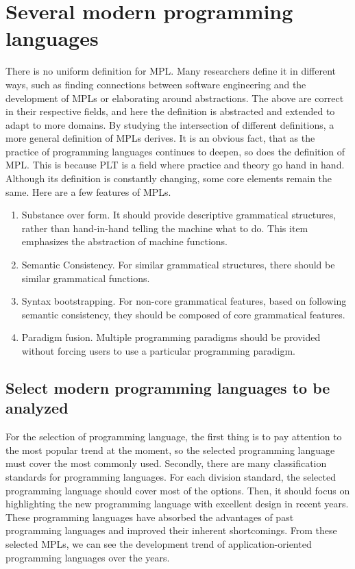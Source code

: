 \section{Several modern programming languages}

There is no uniform definition for MPL. Many researchers define it in different ways, such as finding connections between software engineering and the development of MPLs or elaborating around abstractions. The above are correct in their respective fields, and here the definition is abstracted and extended to adapt to more domains. By studying the intersection of different definitions, a more general definition of MPLs derives. It is an obvious fact, that as the practice of programming languages continues to deepen, so does the definition of MPL. This is because PLT is a field where practice and theory go hand in hand. Although its definition is constantly changing, some core elements remain the same. Here are a few features of MPLs.

\begin{enumerate}
    \item Substance over form. It should provide descriptive grammatical structures, rather than hand-in-hand telling the machine what to do. This item emphasizes the abstraction of machine functions.
    \item Semantic Consistency. For similar grammatical structures, there should be similar grammatical functions.
    \item Syntax bootstrapping. For non-core grammatical features, based on following semantic consistency, they should be composed of core grammatical features.
    \item Paradigm fusion. Multiple programming paradigms should be provided without forcing users to use a particular programming paradigm.
\end{enumerate}

\subsection{Select modern programming languages to be analyzed}

For the selection of programming language, the first thing is to pay attention to the most popular trend at the moment, so the selected programming language must cover the most commonly used. Secondly, there are many classification standards for programming languages. For each division standard, the selected programming language should cover most of the options. Then, it should focus on highlighting the new programming language with excellent design in recent years. These programming languages have absorbed the advantages of past programming languages and improved their inherent shortcomings. From these selected MPLs, we can see the development trend of application-oriented programming languages over the years.

